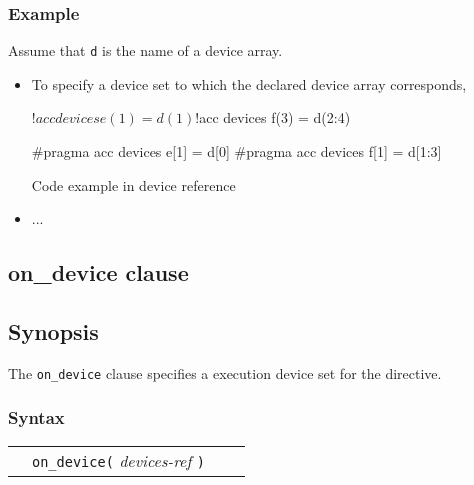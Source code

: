 \subsubsection*{Example}
Assume that {\tt d} is the name of a device array.
\begin{itemize}
\item To specify a device set to which the declared device array corresponds,\\

\begin{myfigure}
\begin{minipage}{0.40\hsize}
\begin{center}
\begin{XACCFexampleL}
!$acc devices e(1) = d(1)
!$acc devices f(3) = d(2:4)
\end{XACCFexampleL}
\end{center}
\end{minipage}
%
\begin{minipage}{0.45\hsize}
\begin{center}
\begin{XACCCexampleR}
#pragma acc devices e[1] = d[0]
#pragma acc devices f[1] = d[1:3]
\end{XACCCexampleR}
\end{center}
\end{minipage}
\caption{Code example in {\XACC} device reference}\label{code:device_ref}
\end{myfigure}

\item ...

\end{itemize}

\subsection{on\_device clause}
\subsection*{Synopsis}
The {\tt on\_device} clause specifies a execution device set for the directive.

\subsubsection*{Syntax}
\begin{tabular}{llll}
             & \verb|on_device(| {\it devices-ref} \verb|)|\\
\end{tabular}

